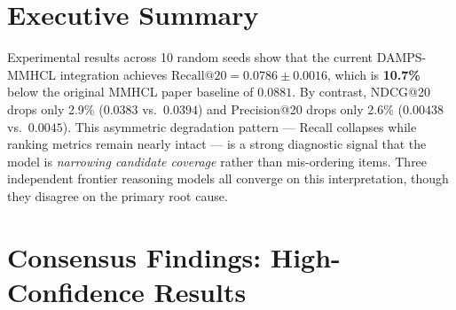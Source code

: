 \documentclass[12pt,a4paper]{article}
\begin{document}
\section{Executive Summary}

Experimental results across 10 random seeds show that the current
DAMPS-MMHCL integration achieves $\text{Recall@20} = 0.0786 \pm 0.0016$,
which is \textbf{10.7\%} below the original MMHCL paper baseline of
$0.0881$.  By contrast, NDCG@20 drops only 2.9\% ($0.0383$ vs.\
$0.0394$) and Precision@20 drops only 2.6\% ($0.00438$ vs.\ $0.0045$).
This asymmetric degradation pattern --- Recall collapses while ranking
metrics remain nearly intact --- is a strong diagnostic signal that the
model is \emph{narrowing candidate coverage} rather than mis-ordering
items.  Three independent frontier reasoning models all converge on this
interpretation, though they disagree on the primary root cause.

\section{Consensus Findings: High-Confidence Results}
\end{document}
